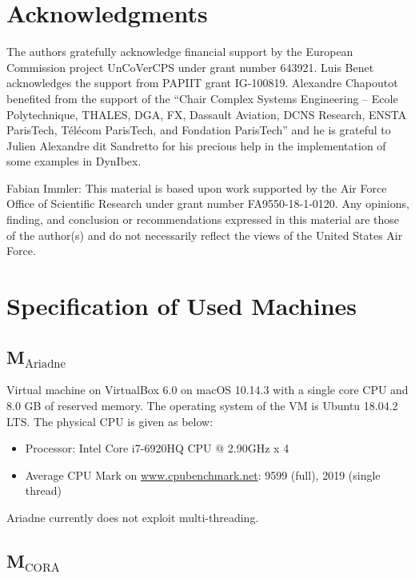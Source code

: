 \documentclass[EPiC]{easychair}
\begin{document}
\section{Acknowledgments}
\label{sect:acks}


The authors gratefully acknowledge financial support by the European Commission project UnCoVerCPS under grant number 643921. Luis Benet acknowledges the support from PAPIIT grant IG-100819. Alexandre Chapoutot benefited from the support of the “Chair Complex Systems Engineering – Ecole Polytechnique, THALES, DGA, FX, Dassault Aviation, DCNS Research, ENSTA ParisTech, Télécom ParisTech, and Fondation ParisTech”  and he is grateful to Julien Alexandre dit Sandretto for his precious help in the implementation of some examples in DynIbex.

Fabian Immler: This material is based upon work supported by the Air Force Office of Scientific Research under grant number FA9550-18-1-0120. Any opinions, finding, and conclusion or recommendations expressed in this material are those of the author(s) and do not necessarily reflect the views of the United States Air Force.

\appendix
\section{Specification of Used Machines} \label{sec:machines}

\subsection{\texorpdfstring{M$_{\text{Ariadne}}$}{M-Ariadne}} \label{sec:machine:Ariadne}
Virtual machine on VirtualBox 6.0 on macOS 10.14.3 with a single core CPU and 8.0 GB of reserved memory. The operating system of the VM is Ubuntu 18.04.2 LTS. The physical CPU is given as below:
\begin{itemize}
    \item Processor: Intel Core i7-6920HQ CPU @ 2.90GHz x 4 
    \item Average CPU Mark on \url{www.cpubenchmark.net}: 9599 (full), 2019 (single thread)
\end{itemize}
Ariadne currently does not exploit multi-threading.

\subsection{\texorpdfstring{M$_{\text{CORA}}$}{M-CORA}} \label{sec:machine:CORA}
\end{document}
